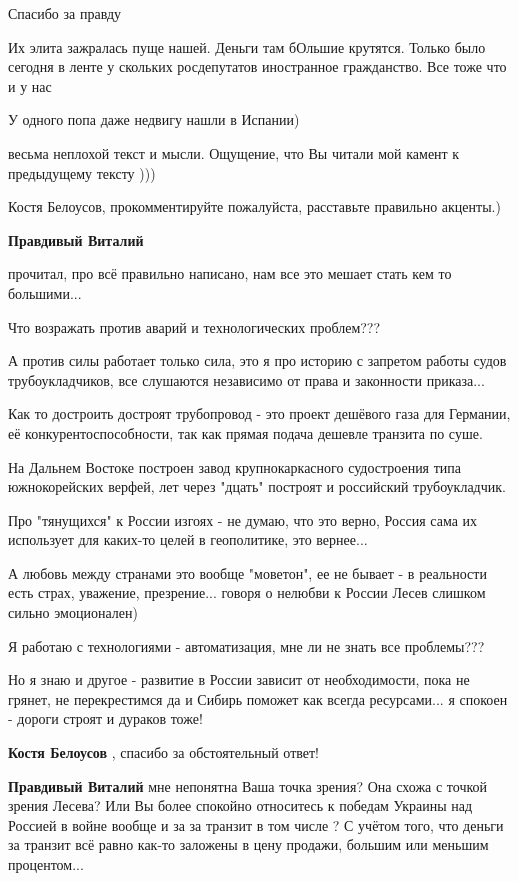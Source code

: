 \begin{itemize}
Спасибо за правду


Их элита зажралась пуще нашей. Деньги там бОльшие крутятся. Только было сегодня
в ленте у скольких росдепутатов иностранное гражданство. Все тоже что и у нас


У одного попа даже недвигу нашли в Испании)

весьма неплохой текст и мысли. Ощущение, что Вы читали мой камент к предыдущему тексту )))

Костя Белоусов, прокомментируйте пожалуйста, расставьте правильно акценты.)

\begin{itemize} %
\textbf{Правдивый Виталий} 

прочитал, про всё правильно написано, нам все это мешает стать кем то
большими...

Что возражать против аварий и технологических проблем???

А против силы работает только сила, это я про историю с запретом работы судов
трубоукладчиков, все слушаются независимо от права и законности приказа...

Как то достроить достроят трубопровод - это проект дешёвого газа для Германии,
её конкурентоспособности, так как прямая подача дешевле транзита по суше.

На Дальнем Востоке построен завод крупнокаркасного судостроения типа
южнокорейских верфей, лет через "дцать" построят и российский трубоукладчик.

Про "тянущихся" к России изгоях - не думаю, что это верно, Россия сама их
использует для каких-то целей в геополитике, это вернее...

А любовь между странами это вообще "моветон", ее не бывает - в реальности есть
страх, уважение, презрение... говоря о нелюбви к России Лесев слишком сильно
эмоционален)

Я работаю с технологиями - автоматизация, мне ли не знать все проблемы???

Но я знаю и другое - развитие в России зависит от необходимости, пока не
грянет, не перекрестимся да и Сибирь поможет как всегда ресурсами... я спокоен -
дороги строят и дураков тоже!


\textbf{Костя Белоусов} , спасибо за обстоятельный ответ!

\textbf{Правдивый Виталий} мне непонятна Ваша точка зрения? Она схожа с точкой зрения Лесева? Или Вы более спокойно относитесь к победам Украины над Россией в войне вообще и за за транзит в том числе ?
С учётом того, что деньги за транзит всё равно как-то заложены в цену продажи, большим или меньшим процентом...


\end{itemize}
\end{itemize}
